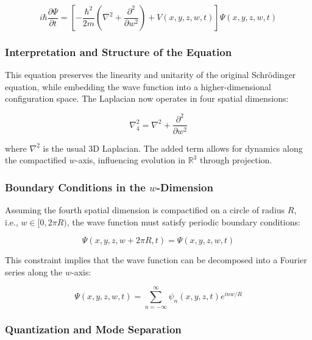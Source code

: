 \documentclass[12pt]{article}
\begin{document}
\begin{equation}
i\hbar \frac{\partial \Psi}{\partial t} = \left[ -\frac{\hbar^2}{2m} \left( \nabla^2 + \frac{\partial^2}{\partial w^2} \right) + V(x, y, z, w, t) \right] \Psi(x, y, z, w, t)
\end{equation}

\subsubsection{Interpretation and Structure of the Equation}

This equation preserves the linearity and unitarity of the original Schrödinger equation, while embedding the wave function into a higher-dimensional configuration space. The Laplacian now operates in four spatial dimensions:

\begin{equation}
\nabla_4^2 = \nabla^2 + \frac{\partial^2}{\partial w^2}
\end{equation}

where \( \nabla^2 \) is the usual 3D Laplacian. The added term allows for dynamics along the compactified \( w \)-axis, influencing evolution in \( \mathbb{R}^3 \) through projection.

\subsubsection{Boundary Conditions in the \( w \)-Dimension}

Assuming the fourth spatial dimension is compactified on a circle of radius \( R \), i.e., \( w \in [0, 2\pi R) \), the wave function must satisfy periodic boundary conditions:

\begin{equation}
\Psi(x, y, z, w + 2\pi R, t) = \Psi(x, y, z, w, t)
\end{equation}

This constraint implies that the wave function can be decomposed into a Fourier series along the \( w \)-axis:

\begin{equation}
\Psi(x, y, z, w, t) = \sum_{n=-\infty}^{\infty} \psi_n(x, y, z, t) e^{i n w / R}
\end{equation}

\subsubsection{Quantization and Mode Separation}
\end{document}
